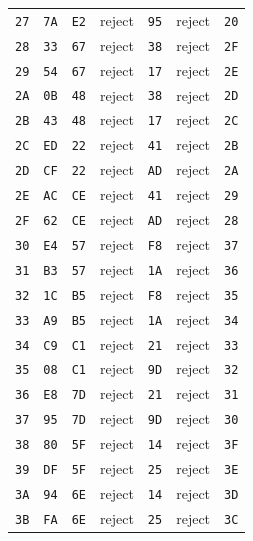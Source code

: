 \begin{longtable}{lllllll}
\texttt{27} & \texttt{7A} & \texttt{E2} & reject & \texttt{95} & reject & \texttt{20}\\
\texttt{28} & \texttt{33} & \texttt{67} & reject & \texttt{38} & reject & \texttt{2F}\\
\texttt{29} & \texttt{54} & \texttt{67} & reject & \texttt{17} & reject & \texttt{2E}\\
\texttt{2A} & \texttt{0B} & \texttt{48} & reject & \texttt{38} & reject & \texttt{2D}\\
\texttt{2B} & \texttt{43} & \texttt{48} & reject & \texttt{17} & reject & \texttt{2C}\\
\texttt{2C} & \texttt{ED} & \texttt{22} & reject & \texttt{41} & reject & \texttt{2B}\\
\texttt{2D} & \texttt{CF} & \texttt{22} & reject & \texttt{AD} & reject & \texttt{2A}\\
\texttt{2E} & \texttt{AC} & \texttt{CE} & reject & \texttt{41} & reject & \texttt{29}\\
\texttt{2F} & \texttt{62} & \texttt{CE} & reject & \texttt{AD} & reject & \texttt{28}\\
\texttt{30} & \texttt{E4} & \texttt{57} & reject & \texttt{F8} & reject & \texttt{37}\\
\texttt{31} & \texttt{B3} & \texttt{57} & reject & \texttt{1A} & reject & \texttt{36}\\
\texttt{32} & \texttt{1C} & \texttt{B5} & reject & \texttt{F8} & reject & \texttt{35}\\
\texttt{33} & \texttt{A9} & \texttt{B5} & reject & \texttt{1A} & reject & \texttt{34}\\
\texttt{34} & \texttt{C9} & \texttt{C1} & reject & \texttt{21} & reject & \texttt{33}\\
\texttt{35} & \texttt{08} & \texttt{C1} & reject & \texttt{9D} & reject & \texttt{32}\\
\texttt{36} & \texttt{E8} & \texttt{7D} & reject & \texttt{21} & reject & \texttt{31}\\
\texttt{37} & \texttt{95} & \texttt{7D} & reject & \texttt{9D} & reject & \texttt{30}\\
\texttt{38} & \texttt{80} & \texttt{5F} & reject & \texttt{14} & reject & \texttt{3F}\\
\texttt{39} & \texttt{DF} & \texttt{5F} & reject & \texttt{25} & reject & \texttt{3E}\\
\texttt{3A} & \texttt{94} & \texttt{6E} & reject & \texttt{14} & reject & \texttt{3D}\\
\texttt{3B} & \texttt{FA} & \texttt{6E} & reject & \texttt{25} & reject & \texttt{3C}\\

\end{longtable}
